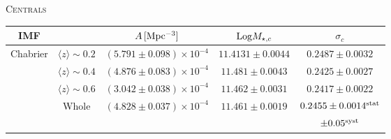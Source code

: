 {\begin{table}\centering
\begin{center}\textsc{Centrals}\end{center}
\begin{tabular}{c|cccc}
\hline
\hline
IMF &&$A\, {\rm [Mpc^{-3}]}$&${\rm Log} M_{\star,c}$&$\sigma_c$\\ %
\hline
Chabrier &$\langle z \rangle \sim 0.2$ & $(5.791 \pm 0.098)\times 10^{-4}$&$11.4131 \pm0.0044$ & $0.2487\pm 0.0032$\\ %
& $\langle z \rangle \sim 0.4$ & $(4.876 \pm 0.083)\times 10^{-4}$ &$11.481\pm 0.0043 $ &  $0.2425 \pm 0.0027$\\ %
& $\langle z \rangle \sim 0.6$  &$(3.042 \pm0.038)\times 10^{-4}$& $11.462\pm 0.0031 $ &  $0.2417  \pm 0.0022 $  \\%
& Whole  &$(4.828 \pm0.037)\times 10^{-4}$& $11.461\pm 0.0019 $ &  $0.2455  \pm 0.0014^{\rm stat} $ \\%
&&&&$\pm 0.05^{\rm syst}$\\


\end{tabular}
\end{table}}
